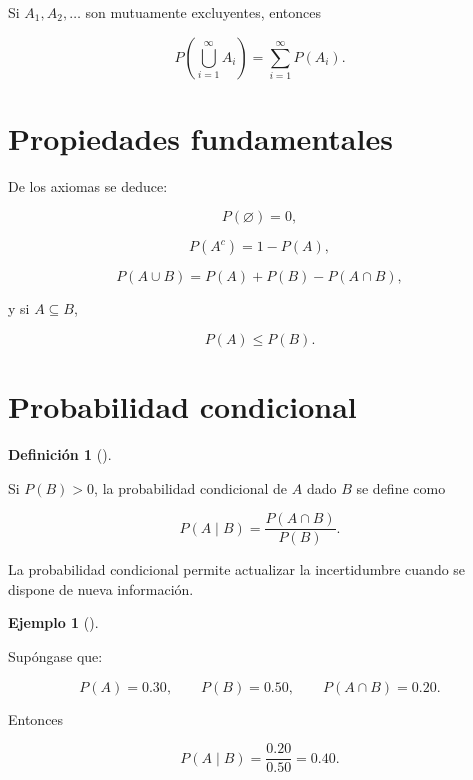 \documentclass[
  spanish,
  10.5pt,
  letterpaper,
  DIV=11,
  numbers=noendperiod,
  oneside,
  open=any]{scrreprt}
\theoremstyle{definition}
\newtheorem{definition}{Definición}[chapter]
\theoremstyle{definition}
\newtheorem{example}{Ejemplo}[chapter]
\theoremstyle{plain}
\theoremstyle{remark}
\begin{document}
Si \(A_1,A_2,\ldots\) son mutuamente excluyentes, entonces

\[
P\left(
\bigcup_{i=1}^{\infty}A_i
\right)
=
\sum_{i=1}^{\infty}P(A_i).
\]

\section*{Propiedades fundamentales}\label{propiedades-fundamentales-1}


De los axiomas se deduce:

\[
P(\varnothing)=0,
\]

\[
P(A^c)=1-P(A),
\]

\[
P(A\cup B)
=
P(A)+P(B)-P(A\cap B),
\]

y si \(A\subseteq B\),

\[
P(A)\leq P(B).
\]

\section*{Probabilidad condicional}\label{probabilidad-condicional}


\begin{definition}[]\protect\hypertarget{def-probabilidad-condicional}{}\label{def-probabilidad-condicional}

Si \(P(B)>0\), la probabilidad condicional de \(A\) dado \(B\) se define
como

\[
P(A\mid B)
=
\frac{P(A\cap B)}{P(B)}.
\]

\end{definition}

La probabilidad condicional permite actualizar la incertidumbre cuando
se dispone de nueva información.

\begin{example}[]\protect\hypertarget{exm-probabilidad-condicional}{}\label{exm-probabilidad-condicional}

Supóngase que:

\[
P(A)=0.30,
\qquad
P(B)=0.50,
\qquad
P(A\cap B)=0.20.
\]

Entonces

\[
P(A\mid B)
=
\frac{0.20}{0.50}
=
0.40.
\]

\end{example}
\end{document}
